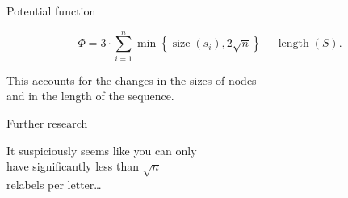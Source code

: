 \documentclass[17pt]{extarticle}
\newcommand{\newslide}[1]{\newpage \begin{center} \large #1 \end{center}}
\DeclareMathOperator{\size}{size}
\DeclareMathOperator{\length}{length}
\begin{document}
\newslide{Potential function}
   \[
	Φ = 3 \cdot \sum\limits_{i=1}^n
	\min\left\{ \size(s_i), 2 \sqrt{n} \right\}
	- \length (S).
   \]

This accounts for the changes in the sizes of nodes \\
and in the length of the sequence.

\newslide{Further research}

It suspiciously seems like you can only \\
have significantly less than $\sqrt{n}$ \\
relabels per letter…
\end{document}
